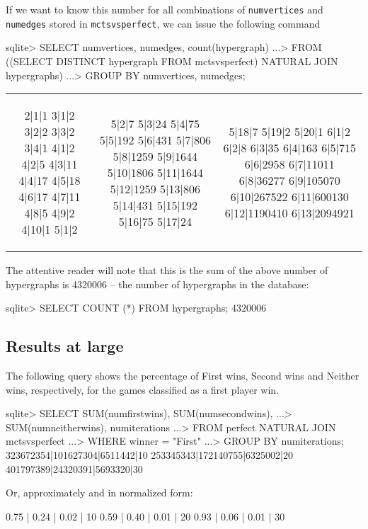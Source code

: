 If we want to know this number for all combinations of \texttt{numvertices} and \texttt{numedges} stored in \texttt{mctsvsperfect}, we can issue the following command
\begin{code}
sqlite> SELECT numvertices, numedges, count(hypergraph)
   ...> FROM ((SELECT DISTINCT hypergraph FROM mctsvsperfect) NATURAL JOIN hypergraphs)
   ...> GROUP BY numvertices, numedges;
\end{code}
\begin{tabular}{|c|c|c|}
\begin{minipage}{1.0in}
\begin{output}
2|1|1
3|1|2
3|2|2
3|3|2
3|4|1
4|1|2
4|2|5
4|3|11
4|4|17
4|5|18
4|6|17
4|7|11
4|8|5
4|9|2
4|10|1
5|1|2
\end{output}
\end{minipage}
&
\begin{minipage}{1.0in}
\begin{output}
5|2|7
5|3|24
5|4|75
5|5|192
5|6|431
5|7|806
5|8|1259
5|9|1644
5|10|1806
5|11|1644
5|12|1259
5|13|806
5|14|431
5|15|192
5|16|75
5|17|24
\end{output}
\end{minipage}
&
\begin{minipage}{1.0in}
\begin{output}
5|18|7
5|19|2
5|20|1
6|1|2
6|2|8
6|3|35
6|4|163
6|5|715
6|6|2958
6|7|11011
6|8|36277
6|9|105070
6|10|267522
6|11|600130
6|12|1190410
6|13|2094921
\end{output}
\end{minipage}
\\
\end{tabular}

The attentive reader will note that this is the sum of the above number of hypergraphs is 4320006 -- the number of hypergraphs in the database:
\begin{code}
sqlite> SELECT COUNT (*) FROM hypergraphs;
4320006
\end{code}

\subsection{Results at large}

The following query shows the percentage of First wins, Second wins and Neither wins, respectively, for the games classified as a first player win.
\begin{code}
sqlite> SELECT SUM(numfirstwins), SUM(numsecondwins),
   ...>        SUM(numneitherwins), numiterations
   ...> FROM perfect NATURAL JOIN mctsvsperfect
   ...> WHERE winner = "First"
   ...> GROUP BY numiterations;
323672354|101627304|6511442|10
253345343|172140755|6325002|20
401797389|24320391|5693320|30
\end{code}
Or, approximately and in normalized form:
\begin{code}
0.75 | 0.24 | 0.02 | 10
0.59 | 0.40 | 0.01 | 20
0.93 | 0.06 | 0.01 | 30
\end{code}

